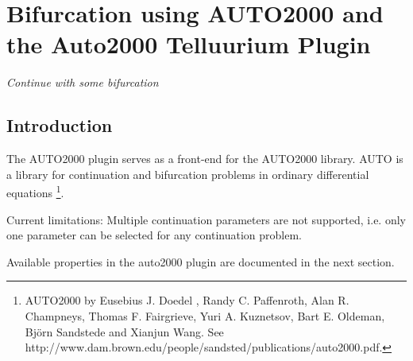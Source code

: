 \chapter*{Bifurcation using AUTO2000 and the Auto2000 Telluurium Plugin}
\setcounter{chapter}{1}
\emph{Continue with some bifurcation}
\section{Introduction}
The AUTO2000 plugin serves as a front-end for the AUTO2000 library. AUTO is a library for continuation and bifurcation problems in ordinary differential equations 
\footnote{AUTO2000 by 
Eusebius J. Doedel , Randy C. Paffenroth, Alan R. Champneys, Thomas F. Fairgrieve, Yuri A. Kuznetsov, Bart E. Oldeman, Bj\"orn Sandstede and Xianjun Wang.
See http://www.dam.brown.edu/people/sandsted/publications/auto2000.pdf.
}.

Current limitations: Multiple continuation parameters are not supported, i.e. only one parameter can be selected for any continuation problem.

Available properties in the auto2000 plugin are documented in the next section.

